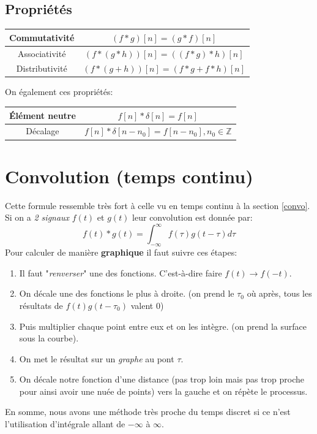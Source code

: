 \documentclass{report}
\begin{document}
\subsection{Propriétés}
\begin{center}
\begin{tabular}{c|c}
	Commutativité & $(f\ast g)[n] = (g \ast f)[n]$ \\
	\hline
	Associativité & $(f \ast (g \ast h))[n] = ((f \ast g) \ast h)[n]$ \\
	\hline
	Distributivité & $(f \ast (g + h))[n] = (f \ast g + f \ast h)[n]$ \\
\end{tabular}
\end{center}
On également ces propriétés:
\begin{center}
\begin{tabular}{c|c}
	Élément neutre & $f[n] \ast \delta[n] = f[n]$ \\
	\hline
	Décalage & $f[n] \ast \delta[n-n_0] = f[n-n_0], n_0 \in \mathbb{Z}$ \\
\end{tabular}
\end{center}

\section{Convolution (temps continu)}
Cette formule ressemble très fort à celle vu en temps continu à la section \ref{convo}. Si on a \textit{2 signaux} $f(t)$ et $g(t)$ leur convolution est donnée par:
\begin{equation}
f(t) \ast g(t) = \int_{-\infty}^{\infty}f(\tau)g(t-\tau)d\tau
\end{equation}
Pour calculer de manière \textbf{graphique} il faut suivre ces étapes:
\begin{enumerate}
\item Il faut "\textit{renverser}" une des fonctions. C'est-à-dire faire $f(t) \rightarrow f(-t)$.
\item On décale une des fonctions le plus à droite. (on prend le $\tau_0$ où après, tous les résultats de $f(t)g(t-\tau_0)$ valent $0$) 
\item Puis multiplier chaque point entre eux et on les intègre. (on prend la surface sous la courbe).
\item On met le résultat sur un \textit{graphe} au pont $\tau$.
\item On décale notre fonction d'une distance (pas trop loin mais pas trop proche pour ainsi avoir une nuée de points) vers la gauche et on répète le processus.
\end{enumerate}
En somme, nous avons une méthode très proche du temps discret si ce n'est l'utilisation d'intégrale allant de $-\infty$ à $\infty$.
\end{document}
